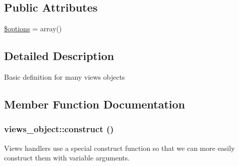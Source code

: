 \subsection*{Public Attributes}
\begin{CompactItemize}
\item 
\hyperlink{classviews__object_cfeb20d60cb18400bcfdcaa3e6c9835f}{\$options} = array()
\end{CompactItemize}


\subsection{Detailed Description}
Basic definition for many views objects 

\subsection{Member Function Documentation}
\hypertarget{classviews__object_6583d6be7e59dd1e39056e320ea2c2d4}{
\subsubsection[{construct}]{\setlength{\rightskip}{0pt plus 5cm}views\_\-object::construct ()}}
\label{classviews__object_6583d6be7e59dd1e39056e320ea2c2d4}


Views handlers use a special construct function so that we can more easily construct them with variable arguments. 

